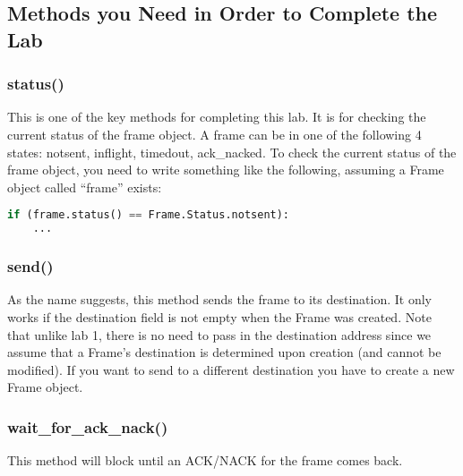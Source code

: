 \documentclass[11pt]{article}
\begin{document}
\subsection{Methods you Need in Order to Complete the Lab}

\subsubsection{status()}
This is one of the key methods for completing this lab. It is for checking the current status of the frame object. A frame can be in one of the following 4 states: notsent, inflight, timedout, ack\_nacked. To check the current status of the frame object, you need to write something like the following, assuming a Frame object called ``frame'' exists:
\begin{lstlisting}[caption={Frame status}, language=python]
if (frame.status() == Frame.Status.notsent):
    ...
\end{lstlisting}

\subsubsection{send()}
As the name suggests, this method sends the frame to its destination. It only works if the destination field is not empty when the Frame was created. Note that unlike lab 1, there is no need to pass in the destination address since we assume that a Frame's destination is determined upon creation (and cannot be modified). If you want to send to a different destination you have to
create a new Frame object.

\subsubsection{wait\_for\_ack\_nack()}
This method will block until an ACK/NACK for the frame comes back.
\end{document}
